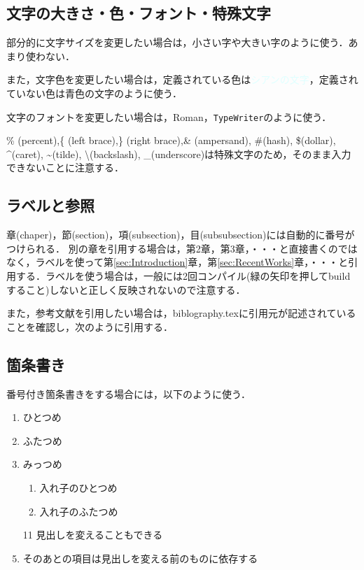 \subsection{文字の大きさ・色・フォント・特殊文字}\label{sec:文字}
部分的に文字サイズを変更したい場合は，{\tiny 小さい字}や{\large 大きい字}のように使う．あまり使わない．

また，文字色を変更したい場合は，定義されている色は\textcolor{lightcyan}{シアンの文字}，定義されていない色は\textcolor[rgb]{0.0,0.0,1.0}{青色の文字}のように使う．

文字のフォントを変更したい場合は，\textrm{Roman}，\texttt{TypeWriter}のように使う．

\% (percent),\{ (left brace),\} (right brace),\& (ampersand), \#(hash), \$(dollar), \textasciicircum(caret), \textasciitilde(tilde), \textbackslash(backslash), \_(underscore)は特殊文字のため，そのまま入力できないことに注意する．

\subsection{ラベルと参照}\label{sec:ラベル}
章(chaper)，節(section)，項(subsection)，目(subsubsection)には自動的に番号がつけられる．
別の章を引用する場合は，第2章，第3章，・・・と直接書くのではなく，ラベルを使って第\ref{sec:Introduction}章，第\ref{sec:RecentWorks}章，・・・と引用する．ラベルを使う場合は，一般には2回コンパイル(緑の矢印を押してbuildすること)しないと正しく反映されないので注意する．

また，参考文献を引用したい場合は，biblography.texに引用元が記述されていることを確認し，次\cite{Krizhevsky_2012}のように引用する．

\subsection{箇条書き}\label{sec:箇条書き}
番号付き箇条書きをする場合には，以下のように使う．
\begin{enumerate}
    \item ひとつめ
    \item ふたつめ
    \item みっつめ
    \begin{enumerate}
        \item 入れ子のひとつめ
        \item 入れ子のふたつめ
    \end{enumerate}
    \item[11] 見出しを変えることもできる 
    \item そのあとの項目は見出しを変える前のものに依存する
\end{enumerate}

